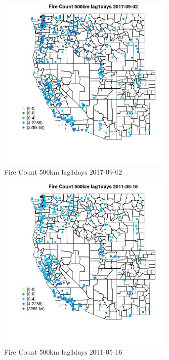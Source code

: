 \begin{figure} 
\centering  
\includegraphics[width=0.77\textwidth]{Code_Outputs/Report_ML_input_PM25_Step4_part_e_de_duplicated_aves_compiled_2019-05-21wNAs_MapObsFire_Count_500km_lag1days2017-09-02.jpg} 
\caption{\label{fig:Report_ML_input_PM25_Step4_part_e_de_duplicated_aves_compiled_2019-05-21wNAsMapObsFire_Count_500km_lag1days2017-09-02}Fire Count 500km lag1days 2017-09-02} 
\end{figure} 
 

\begin{figure} 
\centering  
\includegraphics[width=0.77\textwidth]{Code_Outputs/Report_ML_input_PM25_Step4_part_e_de_duplicated_aves_compiled_2019-05-21wNAs_MapObsFire_Count_500km_lag1days2011-05-16.jpg} 
\caption{\label{fig:Report_ML_input_PM25_Step4_part_e_de_duplicated_aves_compiled_2019-05-21wNAsMapObsFire_Count_500km_lag1days2011-05-16}Fire Count 500km lag1days 2011-05-16} 
\end{figure} 
 

